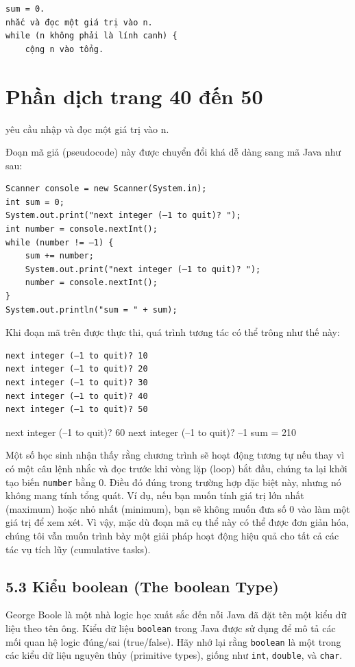 \begin{verbatim}
sum = 0.
nhắc và đọc một giá trị vào n.
while (n không phải là lính canh) {
    cộng n vào tổng.
\end{verbatim}


\section{Phần dịch trang 40 đến 50}
yêu cầu nhập và đọc một giá trị vào n.


Đoạn mã giả (pseudocode) này được chuyển đổi khá dễ dàng sang mã Java như sau:

\begin{verbatim}
Scanner console = new Scanner(System.in);
int sum = 0;
System.out.print("next integer (–1 to quit)? ");
int number = console.nextInt();
while (number != –1) {
    sum += number;
    System.out.print("next integer (–1 to quit)? ");
    number = console.nextInt();
}
System.out.println("sum = " + sum);
\end{verbatim}


Khi đoạn mã trên được thực thi, quá trình tương tác có thể trông như thế này:

\begin{verbatim}
next integer (–1 to quit)? 10 
next integer (–1 to quit)? 20 
next integer (–1 to quit)? 30 
next integer (–1 to quit)? 40 
next integer (–1 to quit)? 50 
\end{verbatim}

next integer (–1 to quit)? 60 
next integer (–1 to quit)? –1 
sum = 210 


Một số học sinh nhận thấy rằng chương trình sẽ hoạt động tương tự nếu thay vì có một câu lệnh nhắc và đọc trước khi vòng lặp (loop) bắt đầu, chúng ta lại khởi tạo biến \texttt{number} bằng 0. Điều đó đúng trong trường hợp đặc biệt này, nhưng nó không mang tính tổng quát. Ví dụ, nếu bạn muốn tính giá trị lớn nhất (maximum) hoặc nhỏ nhất (minimum), bạn sẽ không muốn đưa số 0 vào làm một giá trị để xem xét. Vì vậy, mặc dù đoạn mã cụ thể này có thể được đơn giản hóa, chúng tôi vẫn muốn trình bày một giải pháp hoạt động hiệu quả cho tất cả các tác vụ tích lũy (cumulative tasks).

\subsection*{5.3 Kiểu boolean (The boolean Type)}

George Boole là một nhà logic học xuất sắc đến nỗi Java đã đặt tên một kiểu dữ liệu theo tên ông. Kiểu dữ liệu \texttt{boolean} trong Java được sử dụng để mô tả các mối quan hệ logic đúng/sai (true/false). Hãy nhớ lại rằng \texttt{boolean} là một trong các kiểu dữ liệu nguyên thủy (primitive types), giống như \texttt{int}, \texttt{double}, và \texttt{char}.

